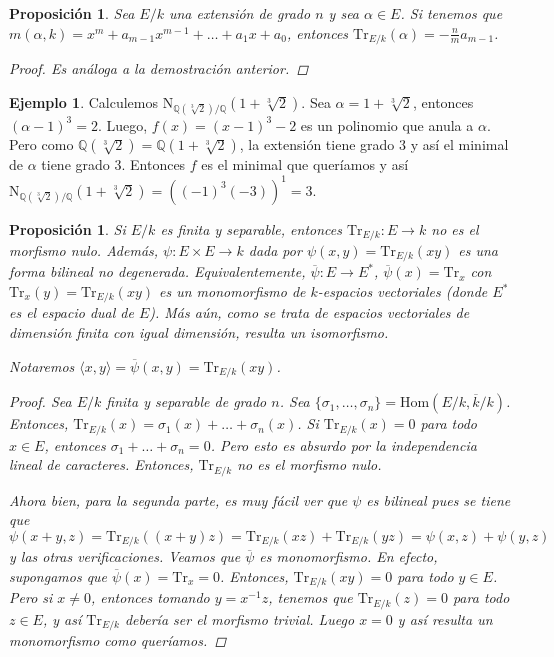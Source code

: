 \documentclass[12pt]{book}
\newtheorem{prop}[teo]{Proposición}
\theoremstyle{definition}
\newtheorem{ex}[teo]{Ejemplo}
\newcommand{\QQ}{\mathbb{Q}}
\renewcommand{\hom}{\mathrm{Hom}}
\begin{document}
\begin{prop}
Sea $E/k$ una extensión de grado $n$ y sea $\alpha\in E$. Si tenemos que $m(\alpha,k)=x^m + a_{m-1}x^{m-1}+\ldots + a_1x+a_0$, entonces $\mathrm{Tr}_{E/k}(\alpha) = -\frac{n}{m}a_{m-1}$.
\begin{proof}
Es análoga a la demostración anterior.
\end{proof}
\end{prop}

\begin{ex}
Calculemos $\mathrm{N}_{\QQ(\sqrt[3]{2})/\QQ}(1+\sqrt[3]{2})$. Sea $\alpha = 1 + \sqrt[3]{2}$, entonces $(\alpha-1)^3 = 2$. Luego, $f(x) = (x-1)^3 - 2$ es un polinomio que anula a $\alpha$. Pero como $\QQ(\sqrt[3]{2})=\QQ(1+\sqrt[3]{2})$, la extensión tiene grado $3$ y así el minimal de $\alpha$ tiene grado $3$. Entonces $f$ es el minimal que queríamos y así $\mathrm{N}_{\QQ(\sqrt[3]{2})/\QQ}(1+\sqrt[3]{2}) = ((-1)^3(-3))^1 = 3$.
\end{ex}

\begin{prop}
Si $E/k$ es finita y separable, entonces $\mathrm{Tr}_{E/k}:E\to k$ no es el morfismo nulo. Además, $\psi:E\times E\to k$ dada por $\psi(x,y)=\mathrm{Tr}_{E/k}(xy)$ es una forma bilineal no degenerada. Equivalentemente, $\overline{\psi}:E\to E^*$, $\overline{\psi}(x)=\mathrm{Tr}_x$ con $\mathrm{Tr}_x(y)=\mathrm{Tr}_{E/k}(xy)$ es un monomorfismo de $k$-espacios vectoriales (donde $E^*$ es el espacio dual de $E$). Más aún, como se trata de espacios vectoriales de dimensión finita con igual dimensión, resulta un isomorfismo.

Notaremos $\langle x,y\rangle =\overline{\psi}(x,y) = \mathrm{Tr}_{E/k}(xy)$.
\begin{proof}
Sea $E/k$ finita y separable de grado $n$. Sea $\{\sigma_1,\ldots ,\sigma_n\}=\hom(E/k,\overline{k}/k)$. Entonces, $\mathrm{Tr}_{E/k}(x) = \sigma_1(x)+\ldots + \sigma_n(x)$. Si $\mathrm{Tr}_{E/k}(x)=0$ para todo $x\in E$, entonces $\sigma_1+\ldots+\sigma_n=0$. Pero esto es absurdo por la independencia lineal de caracteres. Entonces, $\mathrm{Tr}_{E/k}$ no es el morfismo nulo.

Ahora bien, para la segunda parte, es muy fácil ver que $\psi$ es bilineal pues se tiene que $\psi(x+y,z)= \mathrm{Tr}_{E/k}((x+y)z)=\mathrm{Tr}_{E/k}(xz)+\mathrm{Tr}_{E/k}(yz)=\psi(x,z)+\psi(y,z)$ y las otras verificaciones. Veamos que $\overline{\psi}$ es monomorfismo. En efecto, supongamos que $\overline{\psi}(x)=\mathrm{Tr}_x=0$. Entonces, $\mathrm{Tr}_{E/k}(xy)=0$ para todo $y\in E$. Pero si $x\neq 0$, entonces tomando $y=x^{-1}z$, tenemos que $\mathrm{Tr}_{E/k}(z)=0$ para todo $z\in E$, y así $\mathrm{Tr}_{E/k}$ debería ser el morfismo trivial. Luego $x=0$ y así resulta un monomorfismo como queríamos. 
\end{proof}
\end{prop}
\end{document}
